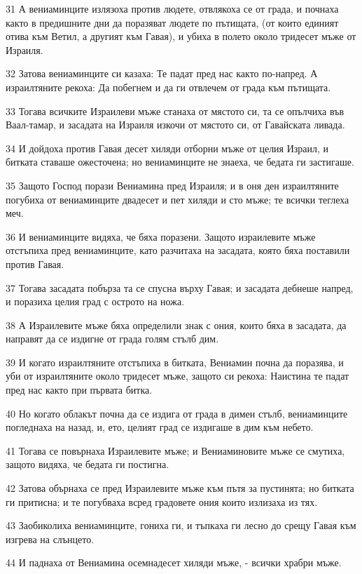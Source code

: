 \par 31 А вениаминците излязоха против людете, отвлякоха се от града, и почнаха както в предишните дни да поразяват людете по пътищата, (от които единият отива към Ветил, а другият към Гавая), и убиха в полето около тридесет мъже от Израиля.
\par 32 Затова вениаминците си казаха: Те падат пред нас както по-напред. А израилтяните рекоха: Да побегнем и да ги отвлечем от града към пътищата.
\par 33 Тогава всичките Израилеви мъже станаха от мястото си, та се опълчиха във Ваал-тамар, и засадата на Израиля изкочи от мястото си, от Гавайската ливада.
\par 34 И дойдоха против Гавая десет хиляди отборни мъже от целия Израил, и битката ставаше ожесточена; но вениаминците не знаеха, че бедата ги застигаше.
\par 35 Защото Господ порази Вениамина пред Израиля; и в оня ден израилтяните погубиха от вениаминците двадесет и пет хиляди и сто мъже; те всички теглеха меч.
\par 36 И вениаминците видяха, че бяха поразени. Защото израилевите мъже отстъпиха пред вениаминците, като разчитаха на засадата, която бяха поставили против Гавая.
\par 37 Тогава засадата побърза та се спусна върху Гавая; и засадата дебнеше напред, и поразиха целия град с острото на ножа.
\par 38 А Израилевите мъже бяха определили знак с ония, които бяха в засадата, да направят да се издигне от града голям стълб дим.
\par 39 И когато израилтяните отстъпиха в битката, Вениамин почна да поразява, и уби от израилтяните около тридесет мъже, защото си рекоха: Наистина те падат пред нас както при първата битка.
\par 40 Но когато облакът почна да се издига от града в димен стълб, вениаминците погледнаха на назад, и, ето, целият град се издигаше в дим към небето.
\par 41 Тогава се повърнаха Израилевите мъже; и Вениаминовите мъже се смутиха, защото видяха, че бедата ги постигна.
\par 42 Затова обърнаха се пред Израилевите мъже към пътя за пустинята; но битката ги притисна; и те погубваха всред градовете ония които излизаха из тях.
\par 43 Заобиколиха вениаминците, гониха ги, и тъпкаха ги лесно до срещу Гавая към изгрева на слънцето.
\par 44 И паднаха от Вениамина осемнадесет хиляди мъже, - всички храбри мъже.
